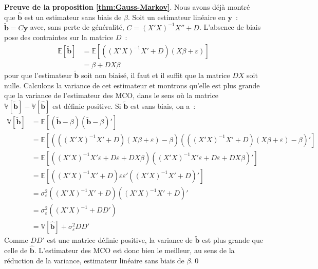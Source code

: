 \documentclass[10pt]{beamer}
\theoremstyle{plain}
\begin{document}
\begin{notes}
  \textbf{Preuve de la proposition \ref{thm:Gauss-Markov}}. Nous avons déjà montré que $\hat{\mathbf b}$ est un estimateur sans biais de $\beta$. Soit un estimateur linéaire en $\mathbf y$~: $\tilde{\mathbf b} = C \mathbf y$ avec, sans perte de généralité, $C = (X'X)^{-1}X'' + D$. L'absence de biais pose des contraintes sur la matrice $D$~:
  \[
    \begin{split}
      \mathbb E\left[\tilde{\mathbf b}\right] &= \mathbb E\left[\left( (X'X)^{-1}X'+D \right)\left( X\beta + \varepsilon \right)\right]\\
      &= \beta + DX\beta
    \end{split}
  \]
  pour que l'estimateur $\tilde{\mathbf b}$ soit non biaisé, il faut et il suffit que la matrice $DX$ soit nulle. Calculons la variance de cet estimateur et montrons qu'elle est plus grande que la variance de l'estimateur des MCO, dans le sens où la matrice $\mathbb V\left[\tilde{\mathbf b}\right] - \mathbb V\left[\hat{\mathbf b}\right]$ est définie positive. Si $\tilde{\mathbf b}$ est sans biais, on a~:
  \[
    \begin{split}
      \mathbb V\left[\tilde{\mathbf b}\right] &= \mathbb E\left[\left( \tilde{\mathbf b}-\beta \right)\left( \tilde{\mathbf b}-\beta \right)'\right] \\
                                              &= \mathbb E\left[\left( \left( (X'X)^{-1}X'+D \right)\left( X\beta + \varepsilon \right) -\beta \right)\left( \left( (X'X)^{-1}X'+D \right)\left( X\beta + \varepsilon \right)-\beta \right)'\right]\\
                                              &= \mathbb E\left[ \left((X'X)^{-1}X'\varepsilon  + D\varepsilon + DX\beta \right)\left((X'X)^{-1}X'\varepsilon  + D\varepsilon + DX\beta \right)'\right]\\
                                              &= \mathbb E\left[ \left((X'X)^{-1}X'  + D\right)\varepsilon\varepsilon'\left((X'X)^{-1}X'  + D\right)'\right]\\
                                              &= \sigma_{\varepsilon}^2\left((X'X)^{-1}X'  + D\right)\left((X'X)^{-1}X'  + D\right)'\\
                                              &= \sigma_{\varepsilon}^2\left( (X'X)^{-1}  + DD'\right)\\
                                              &= \mathbb V\left[\hat{\mathbf b}\right] + \sigma_{\varepsilon}^2 DD'
    \end{split}
  \]
Comme $DD'$ est une matrice définie positive, la variance de $\tilde{\mathbf b}$ est plus grande que celle de $\hat{\mathbf b}$. L'estimateur des MCO est donc bien le meilleur, au sens de la réduction de la variance, estimateur linéaire sans biais de $\beta$.\qed
\end{notes}
\end{document}
